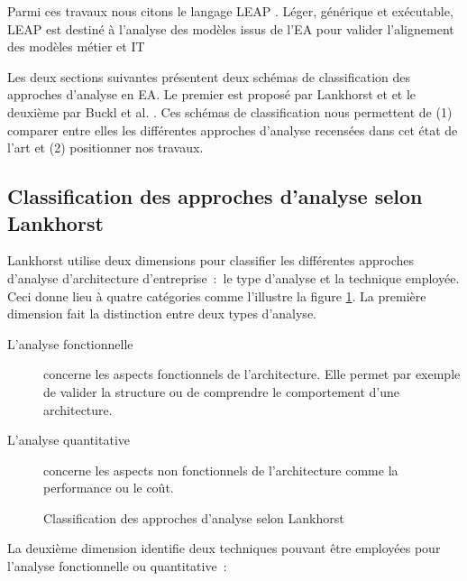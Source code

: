 Parmi ces travaux nous citons le langage LEAP \cite{clark2011leap}. Léger, 
générique et exécutable, LEAP est destiné à l'analyse des modèles issus de l'EA 
pour valider l'alignement des modèles métier et IT 

Les deux sections suivantes présentent deux schémas de classification des
approches d'analyse en EA. Le premier est proposé par Lankhorst
\cite{lankhorst2013enterprise} et et le deuxième par Buckl et al. \cite{buckl2009classifying}. Ces schémas de classification nous permettent de (1) comparer entre elles les différentes approches d'analyse recensées dans cet état de l'art et (2) positionner nos travaux.


\subsection{Classification des approches d'analyse selon Lankhorst}

Lankhorst \cite{lankhorst2013enterprise} utilise deux dimensions pour classifier les différentes approches d'analyse d'architecture d'entreprise~:~le type d'analyse et la technique employée. Ceci donne lieu à quatre catégories comme l'illustre la
figure \ref{fig:classLankhorst}. La première dimension fait la distinction
entre deux types d'analyse.

\begin{description}
    \item[L'analyse fonctionnelle] concerne les aspects fonctionnels de
    l'architecture. Elle permet par exemple de valider la structure ou de
    comprendre le comportement d'une architecture.

    \item[L'analyse quantitative] concerne les aspects non fonctionnels de
    l'architecture comme la performance ou le coût.
\end{description}

\begin{figure}[!ht]
    \begin{center}
        
    \end{center}
    \caption{Classification des approches d'analyse selon Lankhorst 
    \protect\cite{lankhorst2013enterprise}}
    \label{fig:classLankhorst}
\end{figure}

La deuxième dimension identifie deux techniques pouvant être employées pour 
l'analyse fonctionnelle ou quantitative~:

